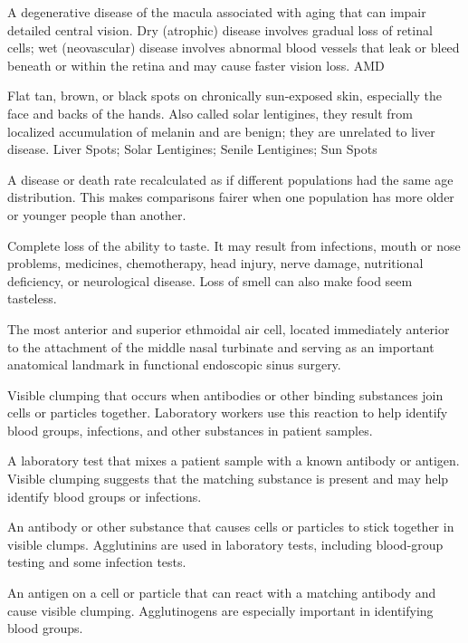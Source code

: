  A degenerative disease of the macula associated with aging that can impair detailed central vision. Dry (atrophic) disease involves gradual loss of retinal cells; wet (neovascular) disease involves abnormal blood vessels that leak or bleed beneath or within the retina and may cause faster vision loss.
\synonyms
AMD

 Flat tan, brown, or black spots on chronically sun-exposed skin, especially the face and backs of the hands. Also called solar lentigines, they result from localized accumulation of melanin and are benign; they are unrelated to liver disease.
\synonyms
Liver Spots; Solar Lentigines; Senile Lentigines; Sun Spots

 A disease or death rate recalculated as if different populations had the same age distribution. This makes comparisons fairer when one population has more older or younger people than another.

 Complete loss of the ability to taste. It may result from infections, mouth or nose problems, medicines, chemotherapy, head injury, nerve damage, nutritional deficiency, or neurological disease. Loss of smell can also make food seem tasteless.

 The most anterior and superior ethmoidal air cell, located immediately anterior to the attachment of the middle nasal turbinate and serving as an important anatomical landmark in functional endoscopic sinus surgery.

 Visible clumping that occurs when antibodies or other binding substances join cells or particles together. Laboratory workers use this reaction to help identify blood groups, infections, and other substances in patient samples.

 A laboratory test that mixes a patient sample with a known antibody or antigen. Visible clumping suggests that the matching substance is present and may help identify blood groups or infections.

 An antibody or other substance that causes cells or particles to stick together in visible clumps. Agglutinins are used in laboratory tests, including blood-group testing and some infection tests.

 An antigen on a cell or particle that can react with a matching antibody and cause visible clumping. Agglutinogens are especially important in identifying blood groups.

